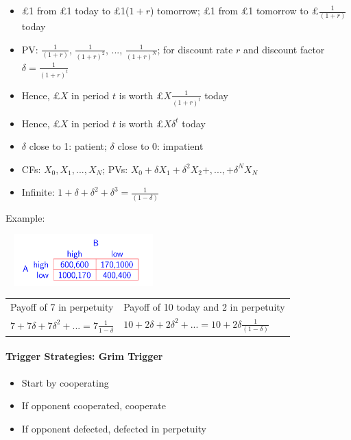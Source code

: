 \documentclass[11pt, english]{article}
\begin{document}
	\begin{itemize}
	\setlength\itemsep{0cm}
		\item \pounds1 from \pounds1 today to \pounds1($1+r$) tomorrow; \pounds1 from \pounds1 tomorrow to \pounds$\frac{1}{(1+r)}$ today
		\item PV: $\frac{1}{(1+r)}$, $\frac{1}{(1+r)^2}$, ..., $\frac{1}{(1+r)^N}$; for discount rate $r$ and discount factor $\delta=\frac{1}{(1+r)^t}$
		\item Hence, \pounds$X$ in period $t$ is worth \pounds$X\frac{1}{(1+r)^t}$ today
		\item Hence, \pounds$X$ in period $t$ is worth \pounds$X\delta^t$ today
		\item $\delta$ close to 1: patient; $\delta$ close to 0: impatient
		\item CFs: $X_0,X_1,...,X_N$; PVs: $X_0+\delta X_1+\delta^2X_2+,...,+\delta^NX_N$
		\item Infinite: $1+\delta+\delta^2+\delta^3=\frac{1}{(1-\delta)}$
	\end{itemize}

	Example:

	\begin{center}
		\includegraphics[width=6cm,height=2cm]{EC315-IMG/11.png}
	\end{center}

	\begin{center}
	\begin{tabular}{l|l}
		Payoff of 7 in perpetuity & Payoff of 10 today and 2 in perpetuity\\
		$7+7\delta+7\delta^2+...=7\frac{1}{1-\delta}$ & $10+2\delta+2\delta^2+...=10+2\delta\frac{1}{(1-\delta)}$
	\end{tabular}
	\end{center}

	\newpage

		\paragraph{Trigger Strategies: Grim Trigger}

	\begin{itemize}                
        \setlength\itemsep{0cm}
		\item Start by cooperating
		\item If opponent cooperated, cooperate
		\item If opponent defected, defected in perpetuity
	\end{itemize}
\end{document}
